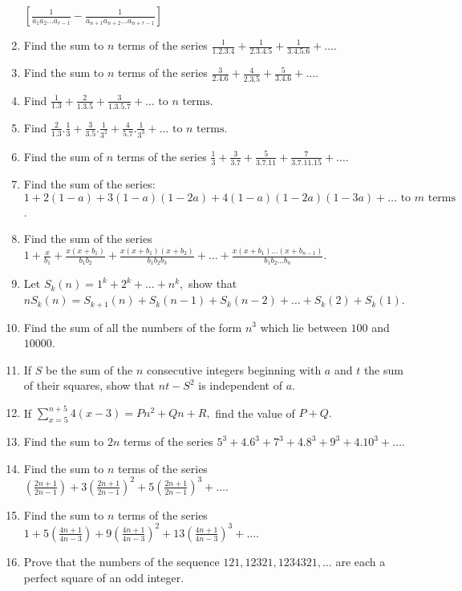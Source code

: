 \begin{enumerate}
  $\left[\frac{1}{a_1a_2\ldots a_{r - 1}} - \frac{1}{a_{n + 1}a_{n + 2}\ldots a_{n + r - 1}}\right]$
\item Find the sum to $n$ terms of the series $\frac{1}{1.2.3.4} + \frac{1}{2.3.4.5} + \frac{1}{3.4.5.6} + \ldots$.
\item Find the sum to $n$ terms of the series $\frac{3}{2.4.6} + \frac{4}{2.3.5} + \frac{5}{3.4.6} + \ldots$.
\item Find $\frac{1}{1.3} + \frac{2}{1.3.5} + \frac{3}{1.3.5.7} + \ldots \text{~to~}n\text{~terms}$.
\item Find $\frac{2}{1.3}.\frac{1}{3} + \frac{3}{3.5}.\frac{1}{3^2} + \frac{4}{5.7}.\frac{1}{3^3} + \ldots
  \text{~to~}n\text{~terms}$.
\item Find the sum of $n$ terms of the series $\frac{1}{3} + \frac{3}{3.7} + \frac{5}{3.7.11} + \frac{7}{3.7.11.15} +
  \ldots$.
\item Find the sum of the series: $1 + 2(1 - a) + 3(1 - a)(1 - 2a) + 4(1 - a)(1 -2a)(1 - 3a) +
  \ldots\text{~to~}m\text{~terms}$.
\item Find the sum of the series $1 + \frac{x}{b_1} + \frac{x(x + b_1)}{b_1b_2} + \frac{x(x + b_1)(x + b_2)}{b_1b_2b_3} +
  \ldots + \frac{x(x + b_1)\ldots(x + b_{n - 1})}{b_1b_2\ldots b_n}$.
\item Let $S_k(n) = 1^k + 2^k + \ldots + n^k,$ show that $nS_k(n) = S_{k+1}(n) + S_k(n - 1) + S_k(n - 2) + \ldots +
  S_k(2) + S_k(1)$.
\item Find the sum of all the numbers of the form $n^3$ which lie between $100$ and $10000$.
\item If $S$ be the sum of the $n$ consecutive integers beginning with $a$ and $t$ the sum of their squares, show that
  $nt - S^2$ is independent of $a$.
\item If $\sum_{x = 5}^{n + 5}4(x - 3) = Pn^2 + Qn + R,$ find the value of $P + Q.$
\item Find the sum to $2n$ terms of the series $5^3 + 4.6^3 + 7^3 + 4.8^3 + 9^3 + 4.10^3 + \ldots$.
\item Find the sum to $n$ terms of the series $\left(\frac{2n + 1}{2n - 1}\right) + 3\left(\frac{2n + 1}{2n - 1}\right)^2
  + 5\left(\frac{2n + 1}{2n - 1}\right)^3 + \ldots$.
\item Find the sum to $n$ terms of the series $1 + 5\left(\frac{4n + 1}{4n - 3}\right) + 9\left(\frac{4n + 1}{4n -
  3}\right)^2 + 13\left(\frac{4n + 1}{4n - 3}\right)^3 + \ldots$.
\item Prove that the numbers of the sequence $121, 12321, 1234321, \ldots$ are each a perfect square of an odd integer.

\end{enumerate}
